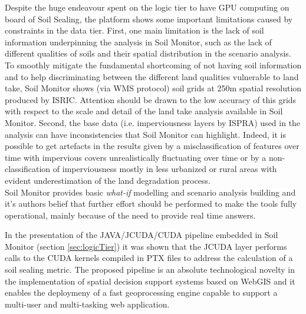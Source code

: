 \documentclass[APA,LATO1COL,doublespace]{WileyNJD-v2}
\newcommand{\toberevised}[1]{\emph{\textcolor{red}{#1}}} %
\begin{document}
Despite the huge endeavour spent on the logic tier to have GPU computing on board of Soil Sealing, the platform shows some important limitations caused by constraints in the data tier.
First, one main limitation is the lack of soil information underpinning the analysis in Soil Monitor, such as the lack of different qualities of soils and their spatial distribution in the scenario analysis.
To smoothly mitigate the fundamental shortcoming of not having soil information and to help discriminating between the different land qualities vulnerable to land take, Soil Monitor shows (via WMS protocol) soil grids at 250m spatial resolution produced by ISRIC.
Attention should be drawn to the low accuracy of this grids with respect to the scale and detail of the land take analysis available in Soil Monitor.
Second, the base data (i.e. imperviousness layers by ISPRA) used in the analysis can have inconsistencies that Soil Monitor can highlight.
Indeed, it is possible to get artefacts in the results given by a misclassification of features over time with impervious covers unrealistically fluctuating over time or by a non-classification of imperviousness mostly in less urbanized or rural areas with evident underestimation of the land degradation process.\\
Soil Monitor provides basic \textit{what-if} modelling and scenario analysis building and it's authors belief that further effort should be performed to make the tools fully operational, mainly because of the need to provide real time answers.

In the presentation of the JAVA/JCUDA/CUDA pipeline embedded in Soil Monitor (section \ref{sec:logicTier}) 
it was shown that the JCUDA layer performs calls to the CUDA kernels compiled in PTX files to address the calculation of a soil sealing metric.
The proposed pipeline is an absolute technological novelty in the implementation of spatial decision support systems based on WebGIS and it enables the deploymeny of a fast geoprocessing engine capable to support a multi-user and multi-tasking web application.
\end{document}
